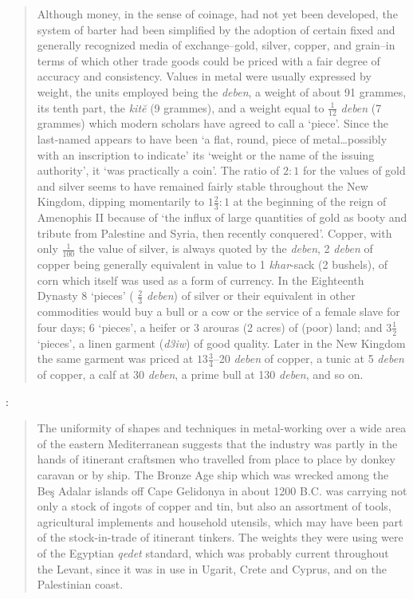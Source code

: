 \documentclass{article}
\begin{document}
\begin{quote}
Although money, in the sense of coinage, had not yet been 
developed, the system of barter had been simplified by the adoption of certain fixed and generally recognized media of exchange--gold, silver, copper, and grain--in terms of which
other trade goods could be priced with a fair degree of accuracy 
and consistency. Values in metal were usually expressed by weight, the units employed being the {\em deben}, a weight of about 91 grammes, its tenth part, the {\em kit\u{e}} (9 grammes), and a weight equal to $\frac{1}{12}$ {\em deben} (7 grammes) which modern scholars have
agreed to call a `piece'.
Since the last-named appears to have
been `a flat, round, piece of metal\dots possibly with an inscription to indicate' its `weight or the name of the issuing authority', it `was
practically a coin'. The ratio of $2:1$ for the values of gold and
silver seems to have remained fairly stable throughout the New Kingdom, dipping momentarily to $1\frac{2}{3}:1$ at the beginning of the reign of Amenophis II because of `the influx of large quantities of
gold as booty and tribute from Palestine and Syria, then recently
conquered'. Copper, with only $\frac{1}{100}$ the value of silver, is always quoted by the {\em deben}, 2 {\em deben} of copper being generally equivalent in value to 1 {\em khar}-sack (2 bushels), of corn which itself was used
as a form of currency. In the Eighteenth Dynasty 8 `pieces'
( $\frac{2}{3}$ {\em deben}) of silver or their equivalent in other commodities would
buy a bull or a cow or the service of a female slave for four days;
6 `pieces', a heifer or 3 arouras (2 acres) of (poor) land; and
$3\frac{1}{2}$ `pieces', a linen garment ({\em d3iw}) of good quality. Later in the
New Kingdom the same garment was priced at $13\frac{3}{4}$--20 {\em deben} of copper, a tunic at 5 {\em deben} of copper,
a calf at 30 {\em deben}, a prime
bull at 130 {\em deben}, and so on.
\end{quote}

\cite[p.~514]{CAHII1}:

\begin{quote}
The uniformity of shapes and techniques in metal-working
over a wide area of the eastern Mediterranean suggests that the industry was partly in the hands of itinerant craftsmen who travelled from place to place by donkey caravan or by ship. The
Bronze Age ship which was wrecked among the Be\c{s} Adalar islands 
off Cape Gelidonya in about 1200 B.C. was carrying not only a stock of ingots of copper and tin, but also an assortment of tools, agricultural implements and household utensils, which may have
been part of the stock-in-trade of itinerant tinkers.
The weights 
they were using were of the Egyptian {\em qedet} standard, which was
probably current throughout the Levant, since it was in use in
Ugarit, Crete and Cyprus, and on the Palestinian coast.
\end{quote}
\end{document}
